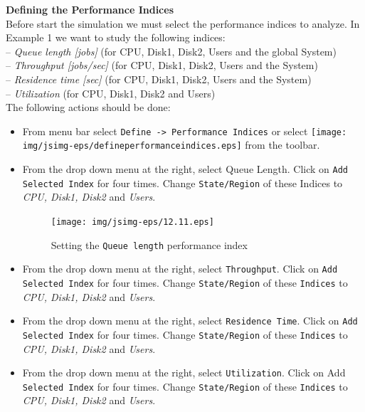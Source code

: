 \noindent \textbf{Defining the Performance Indices}\\
 Before start the
simulation we must select the performance indices to analyze. In
Example 1 we want to study the following
indices:\\
-- \emph{Queue length [jobs]} (for CPU, Disk1, Disk2, Users and
the global System)\\
-- \emph{Throughput [jobs/sec]} (for CPU, Disk1, Disk2, Users and
the System)\\
-- \emph{Residence time [sec]} (for CPU, Disk1, Disk2, Users and
the System)\\
-- \emph{Utilization} (for CPU, Disk1, Disk2 and Users)\\

\noindent The following actions should be done:
\begin{itemize}
\item From menu bar select \texttt{Define -> Performance Indices}
or select
\texttt{[image: img/jsimg-eps/defineperformanceindices.eps]}
from the toolbar. \item From the drop down menu at the right,
select Queue Length. Click on \texttt{Add Selected Index} for four
times. Change \texttt{State/Region} of these Indices to \emph{CPU,
Disk1, Disk2} and \emph{Users}.
\begin{figure}[htb]
    \begin{center}
        \texttt{[image: img/jsimg-eps/12.11.eps]}
    \end{center}
    \caption{Setting the \texttt{Queue length} performance index}
    \label{fig:qlperfind}
\end{figure}
\item From the drop down menu at the right, select
\texttt{Throughput}. Click on \texttt{Add Selected Index} for four
times. Change \texttt{State/Region} of these \texttt{Indices} to
\emph{CPU, Disk1, Disk2} and \emph{Users}.

\item From the drop down menu at the right, select
\texttt{Residence Time}. Click on \texttt{Add Selected Index} for
four times. Change \texttt{State/Region} of these \texttt{Indices}
to \emph{CPU, Disk1, Disk2} and \emph{Users}.

\item From the drop down menu at the right, select
\texttt{Utilization}. Click on Add \texttt{Selected Index} for
four times. Change \texttt{State/Region} of these \texttt{Indices}
to \emph{CPU, Disk1, Disk2} and \emph{Users}.
\end{itemize}
